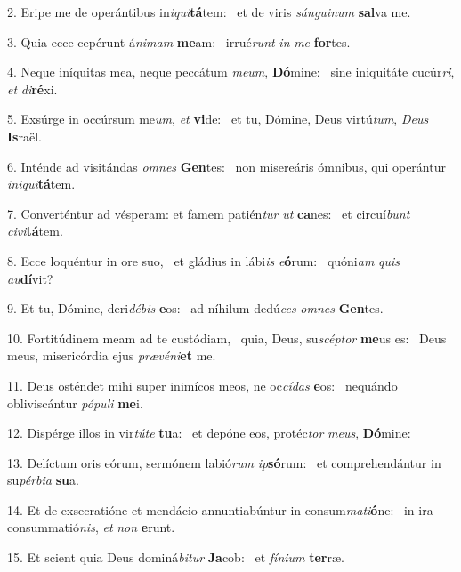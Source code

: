 2. Eripe me de operántibus in\textit{i}\textit{qui}\textbf{tá}tem: \ast\  et de viris \textit{sán}\textit{gui}\textit{num} \textbf{sal}va me.\

3. Quia ecce cepérunt á\textit{ni}\textit{mam} \textbf{me}am: \ast\  irrué\textit{runt} \textit{in} \textit{me} \textbf{for}tes.\

4. Neque iníquitas mea, neque peccátum \textit{me}\textit{um}, \textbf{Dó}mine: \ast\  sine iniquitáte cucúr\textit{ri}, \textit{et} \textit{di}\textbf{ré}xi.\

5. Exsúrge in occúrsum me\textit{um}, \textit{et} \textbf{vi}de: \ast\  et tu, Dómine, Deus virtú\textit{tum}, \textit{De}\textit{us} \textbf{Is}raël.\

6. Inténde ad visitándas \textit{om}\textit{nes} \textbf{Gen}tes: \ast\  non misereáris ómnibus, qui operántur \textit{in}\textit{i}\textit{qui}\textbf{tá}tem.\

7. Converténtur ad vésperam: et famem patién\textit{tur} \textit{ut} \textbf{ca}nes: \ast\  et circuí\textit{bunt} \textit{ci}\textit{vi}\textbf{tá}tem.\

8. Ecce loquéntur in ore suo, \dag\  et gládius in lábi\textit{is} \textit{e}\textbf{ó}rum: \ast\  quóni\textit{am} \textit{quis} \textit{au}\textbf{dí}vit?\

9. Et tu, Dómine, deri\textit{dé}\textit{bis} \textbf{e}os: \ast\  ad níhilum dedú\textit{ces} \textit{om}\textit{nes} \textbf{Gen}tes.\

10. Fortitúdinem meam ad te custódiam, \dag\  quia, Deus, su\textit{scép}\textit{tor} \textbf{me}us es: \ast\  Deus meus, misericórdia ejus \textit{præ}\textit{vé}\textit{ni}\textbf{et} me.\

11. Deus osténdet mihi super inimícos meos, ne oc\textit{cí}\textit{das} \textbf{e}os: \ast\  nequándo obliviscántur \textit{pó}\textit{pu}\textit{li} \textbf{me}i.\

12. Dispérge illos in vir\textit{tú}\textit{te} \textbf{tu}a: \ast\  et depóne eos, protéc\textit{tor} \textit{me}\textit{us}, \textbf{Dó}mine:\

13. Delíctum oris eórum, sermónem labió\textit{rum} \textit{ip}\textbf{só}rum: \ast\  et comprehendántur in su\textit{pér}\textit{bi}\textit{a} \textbf{su}a.\

14. Et de exsecratióne et mendácio annuntiabúntur in consum\textit{ma}\textit{ti}\textbf{ó}ne: \ast\  in ira consummatió\textit{nis}, \textit{et} \textit{non} \textbf{e}runt.\

15. Et scient quia Deus dominá\textit{bi}\textit{tur} \textbf{Ja}cob: \ast\  et \textit{fí}\textit{ni}\textit{um} \textbf{ter}ræ.\

